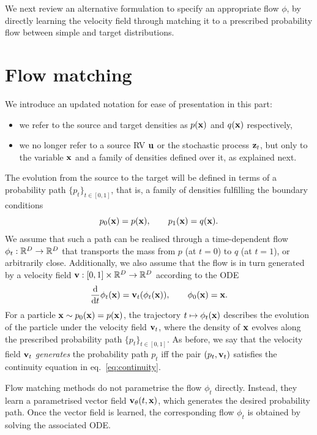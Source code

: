 We next review an alternative formulation to specify an appropriate flow $\phi$, by directly learning the velocity field through matching it to a prescribed probability flow between simple and target distributions.

\section{Flow matching}

We introduce an updated notation for ease of presentation in this part:
\begin{itemize}
    \item we refer to the source and target densities as $p({ \mathbf{x}})$ and $q({ \mathbf{x}})$ respectively,
    \item we no longer refer to a source RV ${ \mathbf{u}}$ or the stochastic process ${ \mathbf{z}}_t$, but only to the variable ${ \mathbf{x}}$ and a family of densities defined over it, as explained next.
\end{itemize}

The evolution from the source to the target will be defined in terms of a probability path $\{p_t\}_{t\in[0,1]}$,  that is, a family of densities fulfilling the boundary conditions
    \[
    p_0({ \mathbf{x}}) = p({ \mathbf{x}}), 
    \qquad
    p_1({ \mathbf{x}}) = q({ \mathbf{x}}).
    \]
We assume that such a path can be realised through a time-dependent flow
$\phi_t:{\mathbb R}^D \to {\mathbb R}^D$ 
that transports the mass from $p$ (at $t=0$) to $q$ (at $t=1$), or arbitrarily close. Additionally, we also assume that the flow is in turn generated by a  velocity field 
${ \mathbf{v}}:[0,1]\times{\mathbb R}^D\to{\mathbb R}^D$
according to the ODE
\[
\frac{{\text{d}}}{{\text{d}} t}\phi_t({ \mathbf{x}})
=
{ \mathbf{v}}_t(\phi_t({ \mathbf{x}})),
\qquad
\phi_0({ \mathbf{x}})={ \mathbf{x}}.
\]
For a particle ${ \mathbf{x}}\sim p_0({ \mathbf{x}}) = p({ \mathbf{x}})$, the trajectory $t \mapsto \phi_t({ \mathbf{x}})$ describes the evolution of the particle under the velocity field ${ \mathbf{v}}_t$, where the density of ${ \mathbf{x}}$ evolves along the prescribed probability path
$\{p_t\}_{t\in[0,1]}$. 
As before, we say that the velocity field ${ \mathbf{v}}_t$ \emph{generates} the probability path $p_t$ iff the pair $(p_t,{ \mathbf{v}}_t)$ satisfies the continuity equation in eq.~\eqref{eq:continuity}.

\begin{remark}
    Flow matching methods do not parametrise the flow $\phi_t$ directly. Instead, they learn a parametrised vector field ${ \mathbf{v}}_\theta(t,{ \mathbf{x}})$, which generates the desired probability path. Once the vector field is learned, the corresponding flow $\phi_t$ is obtained by solving the associated ODE.
\end{remark}


